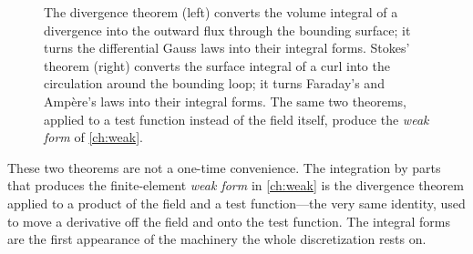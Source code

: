 \begin{figure}[t]
\centering
{}
\caption[The two integral theorems]{The divergence theorem (left) converts the
volume integral of a divergence into the outward flux through the bounding
surface; it turns the differential Gauss laws into their integral forms.
Stokes' theorem (right) converts the surface integral of a curl into the
circulation around the bounding loop; it turns Faraday's and Amp\`ere's laws
into their integral forms. The same two theorems, applied to a test function
instead of the field itself, produce the \emph{weak form} of \cref{ch:weak}.}
\label{fig:theorems}
\end{figure}

These two theorems are not a one-time convenience. The integration by parts that
produces the finite-element \emph{weak form} in \cref{ch:weak} is the
divergence theorem applied to a product of the field and a test function---the
very same identity, used to move a derivative off the field and onto the test
function. The integral forms are the first appearance of the machinery the whole
discretization rests on.

